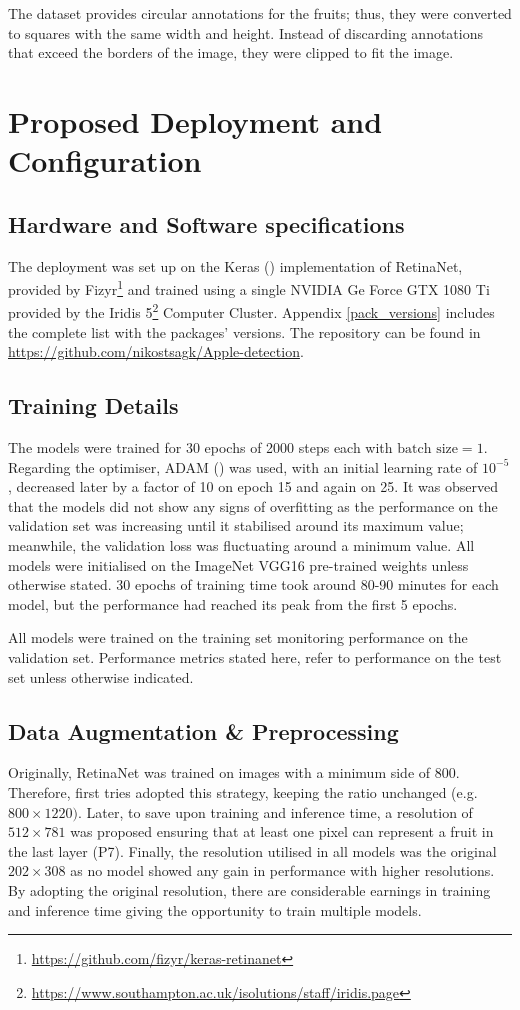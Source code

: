 The dataset provides circular annotations for the fruits; thus, they were converted to squares with the same width and height. Instead of discarding annotations that exceed the borders of the image, they were clipped to fit the image.
 
\section{Proposed Deployment and Configuration}
\subsection{Hardware and Software specifications}
The deployment was set up on the Keras (\cite{chollet2015keras}) implementation of RetinaNet, provided by Fizyr\footnote{\url{https://github.com/fizyr/keras-retinanet}} and trained using a single NVIDIA Ge Force GTX 1080 Ti provided by the Iridis 5\footnote{\url{https://www.southampton.ac.uk/isolutions/staff/iridis.page}} Computer Cluster. Appendix \ref{pack_versions} includes the complete list with the packages' versions. The repository can be found in \url{https://github.com/nikostsagk/Apple-detection}.

\subsection{Training Details}
The models were trained for 30 epochs of 2000 steps each with $\text{batch size} = 1$. Regarding the optimiser, ADAM (\cite{kingma2014adam}) was used, with an initial learning rate of $10^{-5}$, decreased later by a factor of 10 on epoch 15 and again on 25. It was observed that the models did not show any signs of overfitting as the performance on the validation set was increasing until it stabilised around its maximum value; meanwhile, the validation loss was fluctuating around a minimum value. All models were initialised on the ImageNet VGG16 pre-trained weights unless otherwise stated. 30 epochs of training time took around 80-90 minutes for each model, but the performance had reached its peak from the first 5 epochs.

All models were trained on the training set monitoring performance on the validation set. Performance metrics stated here, refer to performance on the test set unless otherwise indicated.

\subsection{Data Augmentation \& Preprocessing}
Originally, RetinaNet was trained on images with a minimum side of 800. Therefore, first tries adopted this strategy, keeping the ratio unchanged (e.g. $800\times1220)$. Later, to save upon training and inference time, a resolution of $512\times781$ was proposed ensuring that at least one pixel can represent a fruit in the last layer (P7). Finally, the resolution utilised in all models was the original $202\times308$ as no model showed any gain in performance with higher resolutions. By adopting the original resolution, there are considerable earnings in training and inference time giving the opportunity to train multiple models.

